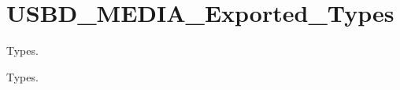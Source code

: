 \hypertarget{group__USBD__MEDIA__Exported__Types}{}\section{U\+S\+B\+D\+\_\+\+M\+E\+D\+I\+A\+\_\+\+Exported\+\_\+\+Types}
\label{group__USBD__MEDIA__Exported__Types}


Types.  


Types. 

